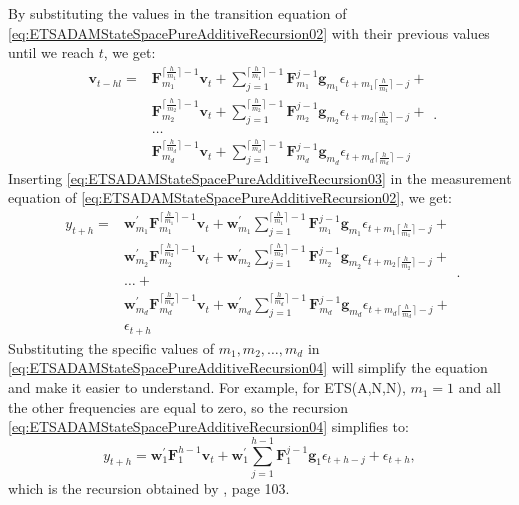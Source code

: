 \documentclass[]{book}
\theoremstyle{definition}
\theoremstyle{definition}
\theoremstyle{definition}
\theoremstyle{definition}
\theoremstyle{remark}
\begin{document}
By substituting the values in the transition equation of \eqref{eq:ETSADAMStateSpacePureAdditiveRecursion02} with their previous values until we reach \(t\), we get:
\begin{equation}
  \begin{aligned}
    \mathbf{v}_{t-h{l}} = & \mathbf{F}_{m_1}^{\lceil\frac{h}{m_1}\rceil-1} \mathbf{v}_{t} + \sum_{j=1}^{\lceil\frac{h}{m_1}\rceil-1} \mathbf{F}_{m_1}^{j-1} \mathbf{g}_{m_1} \epsilon_{t+m_1\lceil\frac{h}{m_1}\rceil-j} + \\
    & \mathbf{F}_{m_2}^{\lceil\frac{h}{m_2}\rceil-1} \mathbf{v}_{t} + \sum_{j=1}^{\lceil\frac{h}{m_2}\rceil-1} \mathbf{F}_{m_2}^{j-1} \mathbf{g}_{m_2} \epsilon_{t+m_2\lceil\frac{h}{m_2}\rceil-j} + \\
    & \dots \\
    & \mathbf{F}_{m_d}^{\lceil\frac{h}{m_d}\rceil-1} \mathbf{v}_{t} + \sum_{j=1}^{\lceil\frac{h}{m_d}\rceil-1} \mathbf{F}_{m_d}^{j-1} \mathbf{g}_{m_d} \epsilon_{t+m_d\lceil\frac{h}{m_d}\rceil-j}
  \end{aligned}.
  \label{eq:ETSADAMStateSpacePureAdditiveRecursion03}
\end{equation}
Inserting \eqref{eq:ETSADAMStateSpacePureAdditiveRecursion03} in the measurement equation of \eqref{eq:ETSADAMStateSpacePureAdditiveRecursion02}, we get:
\begin{equation}
  \begin{aligned}
    y_{t+h} = & \mathbf{w}_{m_1}^\prime \mathbf{F}_{m_1}^{\lceil\frac{h}{m_1}\rceil-1} \mathbf{v}_{t} + \mathbf{w}_{m_1}^\prime \sum_{j=1}^{\lceil\frac{h}{m_1}\rceil-1} \mathbf{F}_{m_1}^{j-1} \mathbf{g}_{m_1} \epsilon_{t+m_1\lceil\frac{h}{m_1}\rceil-j} + \\
    & \mathbf{w}_{m_2}^\prime \mathbf{F}_{m_2}^{\lceil\frac{h}{m_2}\rceil-1} \mathbf{v}_{t} + \mathbf{w}_{m_2}^\prime \sum_{j=1}^{\lceil\frac{h}{m_2}\rceil-1} \mathbf{F}_{m_2}^{j-1} \mathbf{g}_{m_2} \epsilon_{t+m_2\lceil\frac{h}{m_2}\rceil-j} + \\
    & \dots + \\
    & \mathbf{w}_{m_d}^\prime \mathbf{F}_{m_d}^{\lceil\frac{h}{m_d}\rceil-1} \mathbf{v}_{t} + \mathbf{w}_{m_d}^\prime \sum_{j=1}^{\lceil\frac{h}{m_d}\rceil-1} \mathbf{F}_{m_d}^{j-1} \mathbf{g}_{m_d} \epsilon_{t+m_d\lceil\frac{h}{m_d}\rceil-j} + \\
    & \epsilon_{t+h}
  \end{aligned}.
  \label{eq:ETSADAMStateSpacePureAdditiveRecursion04}
\end{equation}
Substituting the specific values of \(m_1, m_2, \dots, m_d\) in \eqref{eq:ETSADAMStateSpacePureAdditiveRecursion04} will simplify the equation and make it easier to understand. For example, for ETS(A,N,N), \(m_1=1\) and all the other frequencies are equal to zero, so the recursion \eqref{eq:ETSADAMStateSpacePureAdditiveRecursion04} simplifies to:
\begin{equation}
    y_{t+h} = \mathbf{w}_{1}^\prime \mathbf{F}_{1}^{h-1} \mathbf{v}_{t} + \mathbf{w}_{1}^\prime \sum_{j=1}^{h-1} \mathbf{F}_{1}^{j-1} \mathbf{g}_{1} \epsilon_{t+h-j} + \epsilon_{t+h} ,
  \label{eq:ETSADAMStateSpacePureAdditiveRecursion06}
\end{equation}
which is the recursion obtained by \citet{Hyndman2008b}, page 103.
\end{document}
